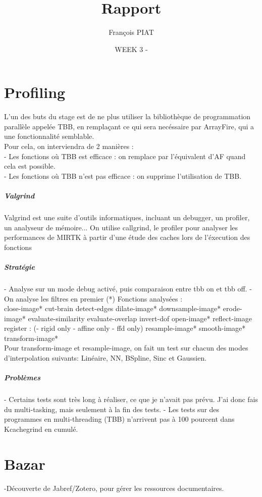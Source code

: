 \documentclass{report}
\title{Rapport}
\author{François PIAT}
\date{WEEK 3 - }
\begin{document}
\maketitle

\chapter*{Profiling}

L'un des buts du stage est de ne plus utiliser la bibliothèque de programmation parallèle appelée TBB, en remplaçant ce qui sera necéssaire par ArrayFire, qui a une fonctionnalité semblable.
\\
Pour cela, on interviendra de 2 manières :\\
- Les fonctions où TBB est efficace : on remplace par l'équivalent d'AF quand cela est possible. \\
- Les fonctions où TBB n'est pas efficace : on supprime l'utilisation de TBB.
\paragraph{Valgrind}
Valgrind est une suite d'outils informatiques, incluant un debugger, un profiler, un analyseur de mémoire...
On utilise callgrind, le profiler pour analyser les performances de MIRTK à partir d'une étude des caches lors de l'éxecution des fonctions 

\paragraph{Stratégie} 
- Analyse sur un mode debug activé, puis comparaison entre tbb on et tbb off.  - On analyse les filtres en premier (*) \newline Fonctions analysées : \newline
\\close-image*
cut-brain
detect-edges
dilate-image*
downsample-image*
erode-image*
evaluate-similarity
evaluate-overlap
invert-dof
open-image*
reflect-image
register : (- rigid only
- affine only
- ffd only)
resample-image*
smooth-image*
transform-image*\\

Pour transform-image et resample-image, on fait un test sur chacun des modes d'interpolation suivants: Linéaire, NN, BSpline, Sinc et Gaussien.

\paragraph{Problèmes}
- Certains tests sont très long à réaliser, ce que je n'avait pas prévu. J'ai donc fais du multi-tasking, mais seulement à la fin des tests.
\newline - Les tests sur des programmes en multi-threading (TBB) n'arrivent pas à 100 pourcent dans Kcachegrind en cumulé. 

\chapter*{Bazar}
-Découverte de Jabref/Zotero, pour gérer les ressources documentaires.
\end{document}
